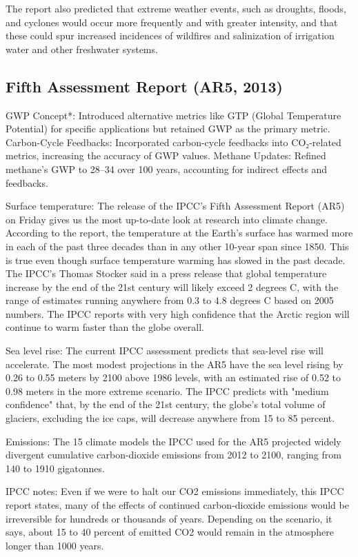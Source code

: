 \documentclass{tufte-handout}\usepackage[]{graphicx}\usepackage[]{xcolor}
\begin{document}
The report also predicted that extreme weather events, such as droughts, floods, and cyclones would occur more frequently and with greater intensity, and that these could spur increased incidences of wildfires and salinization of irrigation water and other freshwater systems.

\subsection{Fifth Assessment Report (AR5, 2013)}
GWP Concept*: Introduced alternative metrics like GTP (Global Temperature Potential) for specific applications but retained GWP as the primary metric.
Carbon-Cycle Feedbacks: Incorporated carbon-cycle feedbacks into CO₂-related metrics, increasing the accuracy of GWP values.
Methane Updates: Refined methane’s GWP to 28–34 over 100 years, accounting for indirect effects and feedbacks.

Surface temperature: The release of the IPCC's Fifth Assessment Report (AR5) on Friday gives us the most up-to-date look at research into climate change. According to the report, the temperature at the Earth's surface has warmed more in each of the past three decades than in any other 10-year span since 1850. This is true even though surface temperature warming has slowed in the past decade. The IPCC's Thomas Stocker said in a press release that global temperature increase by the end of the 21st century will likely exceed 2 degrees C, with the range of estimates running anywhere from 0.3 to 4.8 degrees C based on 2005 numbers. The IPCC reports with very high confidence that the Arctic region will continue to warm faster than the globe overall.

Sea level rise: The current IPCC assessment predicts that sea-level rise will accelerate. The most modest projections in the AR5 have the sea level rising by 0.26 to 0.55 meters by 2100 above 1986 levels, with an estimated rise of 0.52 to 0.98 meters in the more extreme scenario. The IPCC predicts with "medium confidence" that, by the end of the 21st century, the globe's total volume of glaciers, excluding the ice caps, will decrease anywhere from 15 to 85 percent.

Emissions: The 15 climate models the IPCC used for the AR5 projected widely divergent cumulative carbon-dioxide emissions from 2012 to 2100, ranging from 140 to 1910 gigatonnes.

IPCC notes: Even if we were to halt our CO2 emissions immediately, this IPCC report states, many of the effects of continued carbon-dioxide emissions would be irreversible for hundreds or thousands of years. Depending on the scenario, it says, about 15 to 40 percent of emitted CO2 would remain in the atmosphere longer than 1000 years.
\end{document}
